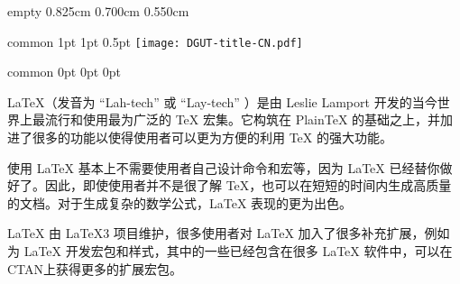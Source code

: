 \documentclass[report,oneside,UTF8,zihao=-4]{config}
\begin{document}
\CoverPage
    {empty} %
    {0.825cm} %
    {0.700cm} %
    {0.550cm} %


\Header
    {common} %
    {1pt} %
    {1pt} %
    {0.5pt} %
    {} %
    {\texttt{[image: DGUT-title-CN.pdf]}} %
    {} %


\Footer
    {common} %
    {0pt} %
    {0pt} %
    {0pt} %
    {} %
    {\thepage} %
    {} %


\SetRomanPageNumber %


\begin{abstractCN}[0.65cm] %

\LaTeX{}（发音为 “Lah-tech” 或 “Lay-tech” ）是由 Leslie Lamport 开发的当今世界上最流行和使用最为广泛的 \TeX{} 宏集。它构筑在 PlainTeX 的基础之上，并加进了很多的功能以使得使用者可以更为方便的利用 \TeX{} 的强大功能。

使用 \LaTeX{} 基本上不需要使用者自己设计命令和宏等，因为 \LaTeX{} 已经替你做好了。因此，即使使用者并不是很了解 \TeX{}，也可以在短短的时间内生成高质量的文档。对于生成复杂的数学公式，\LaTeX{} 表现的更为出色。

\LaTeX{} 由 \LaTeX{3} 项目维护，很多使用者对 \LaTeX{} 加入了很多补充扩展，例如为 \LaTeX{} 开发宏包和样式，其中的一些已经包含在很多 \LaTeX{} 软件中，可以在CTAN上获得更多的扩展宏包。

\def\keywordsCN{关键词1，关键词2，关键词3，关键词4，关键词5}

\end{abstractCN}

\end{document}
